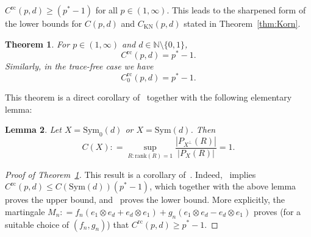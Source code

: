 \documentclass[11pt, a4paper]{amsart}
\newtheorem{theorem}{Theorem}[section]
\newtheorem{lemma}[theorem]{Lemma}
\theoremstyle{definition}
\theoremstyle{remark}
\newcommand{\N}{\mathbb{N}}
\begin{document}
$C^{\mathrm{rc}}(p,d)\ge (p^*-1)$
for all $p\in (1,\infty)$.
This leads to the sharpened form of the lower bounds
for $C(p,d)$ and $C_{\mathrm{KN}}(p,d)$
stated in Theorem~\ref{thm:Korn}.
\begin{theorem}\label{thm:envelope}
For $p\in(1,\infty)$ and $d\in \N\setminus\{0,1\}$,
\begin{equation}
C^{\mathrm{rc}}(p,d)=p^*-1.
\end{equation}
Similarly, in the trace-free case
we have
\begin{equation*}
C^{\mathrm{rc}}_0(p,d)=p^*-1.
\end{equation*}
\end{theorem}
This theorem is a direct
corollary of~\cite[Theorem 2.2]{Cassese2025}
together with 
the following elementary lemma:
\begin{lemma}
Let $X=\mathrm{Sym}_0(d)$ or 
$X=\mathrm{Sym}(d)$. Then
\begin{equation*}
C(X)\mathrel{:}=
\sup_{R:\mathrm{rank}(R)=1}
\frac{|P_{X^\perp}(R)|}{|P_{X}(R)|}=1.
\end{equation*}
\end{lemma}
\begin{proof}[Proof of Theorem~\ref{thm:envelope}]
This result is a corollary
of~\cite[Theorem 2.2]{Cassese2025}.
Indeed,~\cite[Proposition 3.7]{Cassese2025}
implies $C^{\mathrm{rc}}(p,d)
\le C(\mathrm{Sym}(d))(p^*-1)$,
which together with the above lemma
proves the upper bound,
and~\cite[Theorem 2.2]{Cassese2025}
proves the lower bound. More explicitly, the martingale
$M_n\mathrel{:}= f_n(e_1\otimes e_d+e_d\otimes e_1)
+g_n(e_1\otimes e_d-e_d\otimes e_1)$ proves
(for a suitable choice of $(f_n,g_n)$)
that $C^{\mathrm{rc}}(p,d)\ge p^*-1$.
\end{proof}
\end{document}
